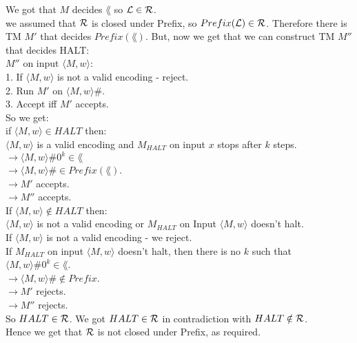 \begin{enumerate}[i.]
          We got that $M$ decides $\lang$ so $\mathcal{L} \in \mathcal{R}$.\\
          we assumed that $\mathcal{R}$ is closed under Prefix, so $Prefix(\mathcal{L}) \in \mathcal{R}$.
          Therefore there is TM $M'$ that decides $Prefix(\lang)$.
          But, now we get that we can construct TM $M''$ that decides HALT: \\

          $M'' \text{ on input } \langle M, w \rangle$: \\
          1. If $\langle M, w \rangle$ is not a valid encoding - reject. \\
          2. Run $M'$ on $\langle M, w \rangle \#$. \\
          3. Accept iff $M'$ accepts. \\

          So we get: \\
          if $\langle M, w \rangle \in HALT$ then: \\
          $\langle M, w \rangle$ is a valid encoding and $M_{HALT}$ on
          input $x$ stops after $k$ steps. \\
          $\rightarrow \langle M, w \rangle \#0^k \in \lang$ \\
          $\rightarrow \langle M, w \rangle \# \in Prefix(\lang)$. \\
          $\rightarrow M'$ accepts. \\
          $\rightarrow M''$ accepts. \\

          If $\langle M, w \rangle \notin HALT$ then: \\
          $\langle M, w \rangle$ is not a valid encoding or $M_{HALT}$ on
          Input $\langle M, w \rangle$ doesn't halt. \\
          If $\langle M, w \rangle$ is not a valid encoding - we reject. \\
          If $M_{HALT}$ on input $\langle M, w \rangle$ doesn't halt, then there is no $k$
          such that $\langle M, w \rangle \#0^k \in \lang$.  \\
          $\rightarrow \langle M, w \rangle \# \notin Prefix$. \\
          $\rightarrow M'$ rejects. \\
          $\rightarrow M''$ rejects. \\

          So $HALT \in \mathcal{R}$.
          We got $HALT \in \mathcal{R}$ in contradiction with $HALT \notin \mathcal{R}$. \\
          Hence we get that $\mathcal{R}$ is not closed under Prefix, as required. \\

\end{enumerate}